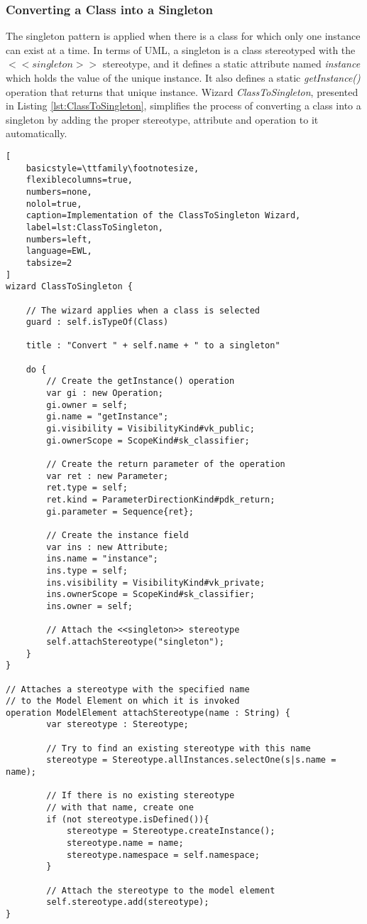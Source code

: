 \subsubsection{Converting a Class into a Singleton}
\label{sec:ClassToSingleton}

The singleton pattern \cite{Larman} is applied when there is a class for which only one instance can exist at a time. In terms of UML, a singleton is a class stereotyped with the $<<singleton>>$ stereotype, and it defines a static attribute named \emph{instance} which holds the value of the unique instance. It also defines a static \emph{getInstance()} operation that returns that unique instance. Wizard \emph{ClassToSingleton}, presented in Listing \ref{lst:ClassToSingleton}, simplifies the process of converting a class into a singleton by adding the proper stereotype, attribute and operation to it automatically.

\begin{lstlisting}[
	basicstyle=\ttfamily\footnotesize, 
	flexiblecolumns=true,
	numbers=none,
	nolol=true,
	caption=Implementation of the ClassToSingleton Wizard, 
	label=lst:ClassToSingleton,
	numbers=left,
	language=EWL,
	tabsize=2
]
wizard ClassToSingleton {
	
	// The wizard applies when a class is selected
	guard : self.isTypeOf(Class)
	
	title : "Convert " + self.name + " to a singleton"
	
	do {
		// Create the getInstance() operation 
		var gi : new Operation; 
		gi.owner = self; 
		gi.name = "getInstance"; 
		gi.visibility = VisibilityKind#vk_public; 
		gi.ownerScope = ScopeKind#sk_classifier; 
		
		// Create the return parameter of the operation 
		var ret : new Parameter; 
		ret.type = self; 
		ret.kind = ParameterDirectionKind#pdk_return; 
		gi.parameter = Sequence{ret}; 
		
		// Create the instance field 
		var ins : new Attribute; 
		ins.name = "instance"; 
		ins.type = self; 
		ins.visibility = VisibilityKind#vk_private; 
		ins.ownerScope = ScopeKind#sk_classifier; 
		ins.owner = self; 
		
		// Attach the <<singleton>> stereotype 
		self.attachStereotype("singleton");
	}
}

// Attaches a stereotype with the specified name
// to the Model Element on which it is invoked
operation ModelElement attachStereotype(name : String) {
		var stereotype : Stereotype;
		
		// Try to find an existing stereotype with this name
		stereotype = Stereotype.allInstances.selectOne(s|s.name = name);
		
		// If there is no existing stereotype
		// with that name, create one
		if (not stereotype.isDefined()){
			stereotype = Stereotype.createInstance();
			stereotype.name = name;
			stereotype.namespace = self.namespace;
		}
		
		// Attach the stereotype to the model element
		self.stereotype.add(stereotype);
}
\end{lstlisting}

